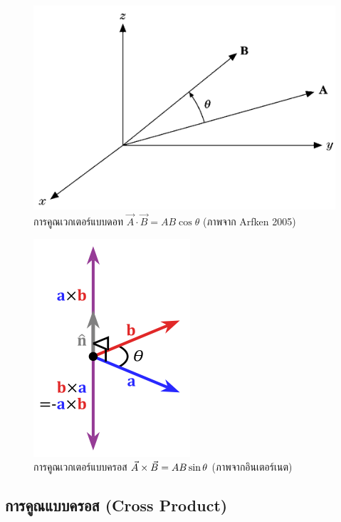 \begin{figure}%
\centering
\includegraphics[width=0.5\columnwidth]{vector-01.png}
\caption{การคูณเวกเตอร์แบบดอท $\vec{A}\cdot\vec{B} = AB\cos \theta$ (ภาพจาก Arfken 2005)}
\label{fig1}
\end{figure}

\begin{figure}%
\centering
\includegraphics[width=0.5\columnwidth]{220px-Cross_product_vector.svg.png}
\caption{การคูณเวกเตอร์แบบครอส $\vec{A}\times\vec{B} = AB\sin \theta$ (ภาพจากอินเตอร์เนต)}
\label{fig2}
\end{figure}

\subsection{การคูณแบบครอส (Cross Product)}

